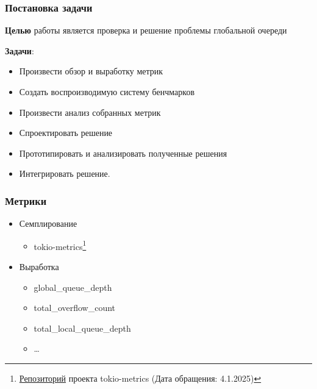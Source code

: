 \documentclass{beamer}
\begin{document}
\begin{frame}
  \frametitle{Постановка задачи}
  \textbf{Целью} работы является проверка и решение проблемы глобальной очереди

  \textbf{Задачи}:
  \begin{itemize}
    \item Произвести обзор и выработку метрик
    \item Создать воспроизводимую систему бенчмарков
    \item Произвести анализ собранных метрик
    \item Спроектировать решение
    \item Прототипировать и анализировать полученные решения
    \item Интегрировать решение.
  \end{itemize}
\end{frame}

\begin{frame}
\frametitle{Метрики}
  \begin{itemize}
    \item Семплирование
    \begin{itemize}
      \item tokio-metrics\footnote{\href{https://github.com/tokio-rs/tokio-metrics}{Репозиторий} проекта tokio-metrics (Дата обращения: 4.1.2025)}
    \end{itemize}
    \item Выработка
    \begin{itemize}
      \item global\_queue\_depth
      \item total\_overflow\_count
      \item total\_local\_queue\_depth
      \item \dots
    \end{itemize}
  \end{itemize}
\end{frame}
\end{document}
